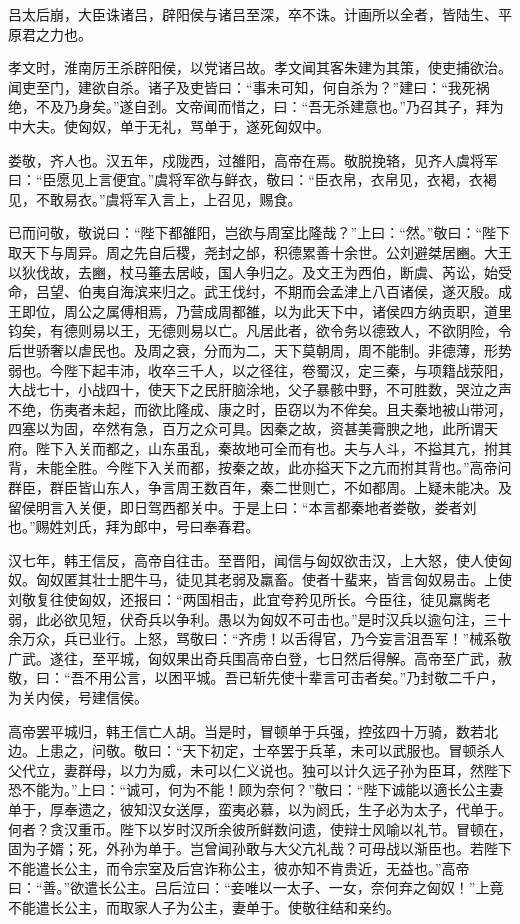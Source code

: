 \documentclass[]{article}
\begin{document}
吕太后崩，大臣诛诸吕，辟阳侯与诸吕至深，卒不诛。计画所以全者，皆陆生、平原君之力也。

孝文时，淮南厉王杀辟阳侯，以党诸吕故。孝文闻其客朱建为其策，使吏捕欲治。闻吏至门，建欲自杀。诸子及吏皆曰：``事未可知，何自杀为？''建曰：``我死祸绝，不及乃身矣。''遂自刭。文帝闻而惜之，曰：``吾无杀建意也。''乃召其子，拜为中大夫。使匈奴，单于无礼，骂单于，遂死匈奴中。

娄敬，齐人也。汉五年，戍陇西，过雒阳，高帝在焉。敬脱挽辂，见齐人虞将军曰：``臣愿见上言便宜。''虞将军欲与鲜衣，敬曰：``臣衣帛，衣帛见，衣褐，衣褐见，不敢易衣。''虞将军入言上，上召见，赐食。

已而问敬，敬说曰：``陛下都雒阳，岂欲与周室比隆哉？''上曰：``然。''敬曰：``陛下取天下与周异。周之先自后稷，尧封之邰，积德累善十余世。公刘避桀居豳。大王以狄伐故，去豳，杖马箠去居岐，国人争归之。及文王为西伯，断虞、芮讼，始受命，吕望、伯夷自海滨来归之。武王伐纣，不期而会孟津上八百诸侯，遂灭殷。成王即位，周公之属傅相焉，乃营成周都雒，以为此天下中，诸侯四方纳贡职，道里钧矣，有德则易以王，无德则易以亡。凡居此者，欲令务以德致人，不欲阴险，令后世骄奢以虐民也。及周之衰，分而为二，天下莫朝周，周不能制。非德薄，形势弱也。今陛下起丰沛，收卒三千人，以之径往，卷蜀汉，定三秦，与项籍战荥阳，大战七十，小战四十，使天下之民肝脑涂地，父子暴骸中野，不可胜数，哭泣之声不绝，伤夷者未起，而欲比隆成、康之时，臣窃以为不侔矣。且夫秦地被山带河，四塞以为固，卒然有急，百万之众可具。因秦之故，资甚美膏腴之地，此所谓天府。陛下入关而都之，山东虽乱，秦故地可全而有也。夫与人斗，不搤其亢，拊其背，未能全胜。今陛下入关而都，按秦之故，此亦搤天下之亢而拊其背也。''高帝问群臣，群臣皆山东人，争言周王数百年，秦二世则亡，不如都周。上疑未能决。及留侯明言入关便，即日驾西都关中。于是上曰：``本言都秦地者娄敬，娄者刘也。''赐姓刘氏，拜为郎中，号曰奉春君。

汉七年，韩王信反，高帝自往击。至晋阳，闻信与匈奴欲击汉，上大怒，使人使匈奴。匈奴匿其壮士肥牛马，徒见其老弱及羸畜。使者十蜚来，皆言匈奴易击。上使刘敬复往使匈奴，还报曰：``两国相击，此宜夸矜见所长。今臣往，徒见羸胔老弱，此必欲见短，伏奇兵以争利。愚以为匈奴不可击也。''是时汉兵以逾句注，三十余万众，兵已业行。上怒，骂敬曰：``齐虏！以舌得官，乃今妄言沮吾军！''械系敬广武。遂往，至平城，匈奴果出奇兵围高帝白登，七日然后得解。高帝至广武，赦敬，曰：``吾不用公言，以困平城。吾已斩先使十辈言可击者矣。''乃封敬二千户，为关内侯，号建信侯。

高帝罢平城归，韩王信亡人胡。当是时，冒顿单于兵强，控弦四十万骑，数若北边。上患之，问敬。敬曰：``天下初定，士卒罢于兵革，未可以武服也。冒顿杀人父代立，妻群母，以力为威，未可以仁义说也。独可以计久远子孙为臣耳，然陛下恐不能为。''上曰：``诚可，何为不能！顾为奈何？''敬曰：``陛下诚能以適长公主妻单于，厚奉遗之，彼知汉女送厚，蛮夷必慕，以为阏氏，生子必为太子，代单于。何者？贪汉重币。陛下以岁时汉所余彼所鲜数问遗，使辩士风喻以礼节。冒顿在，固为子婿；死，外孙为单于。岂曾闻孙敢与大父亢礼哉？可毋战以渐臣也。若陛下不能遣长公主，而令宗室及后宫诈称公主，彼亦知不肯贵近，无益也。''高帝曰：``善。''欲遣长公主。吕后泣曰：``妾唯以一太子、一女，奈何弃之匈奴！''上竟不能遣长公主，而取家人子为公主，妻单于。使敬往结和亲约。
\end{document}
